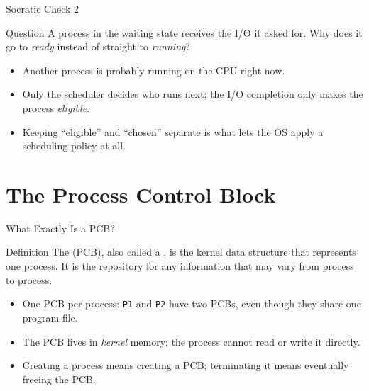 \documentclass[aspectratio=169]{beamer}
\begin{document}
\begin{frame}{Socratic Check 2}
  \begin{block}{Question}
    A process in the waiting state receives the I/O it asked for. Why does it
    go to \emph{ready} instead of straight to \emph{running}?
  \end{block}
  \vspace{0.25cm}
  \begin{itemize}
    \item Another process is probably running on the CPU right now.
    \item Only the scheduler decides who runs next; the I/O completion only
      makes the process \emph{eligible}.
    \item Keeping ``eligible'' and ``chosen'' separate is what lets the OS
      apply a scheduling policy at all.
  \end{itemize}
\end{frame}

\section{The Process Control Block}


\begin{frame}{What Exactly Is a PCB?}
  \begin{block}{Definition}
    The  (PCB), also called a , is the kernel data structure that represents one process. It is
    the repository for any information that may vary from process to process.
  \end{block}
  \begin{itemize}
    \item One PCB per process: \texttt{P1} and \texttt{P2} have two PCBs,
      even though they share one program file.
    \item The PCB lives in \emph{kernel} memory; the process cannot read or
      write it directly.
    \item Creating a process means creating a PCB; terminating it means
      eventually freeing the PCB.
  \end{itemize}
\end{frame}
\end{document}
